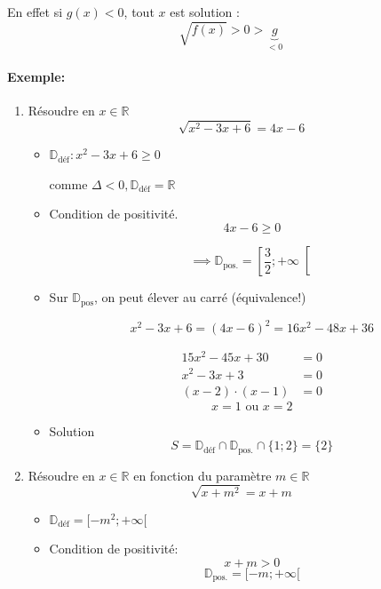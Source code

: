 \documentclass[
    11pt,
    a4paper,
    oneside,
    headinlcude, footinclude,
    twoside,
]{report}
\begin{document}
En effet si $g(x) < 0$, tout $x$ est solution :
$$\sqrt{f(x)} > 0 > \underbrace{g}_{<0}$$

\paragraph{Exemple:}

\begin{enumerate}
    \item Résoudre en $x \in \mathbb{R}$ $$\sqrt{x^{2} - 3x + 6} = 4x - 6$$

    \begin{itemize}
        \item $\mathbb{D}_{\text{déf}}: x^{2}-3x + 6 \geq 0$ 
            
            comme $\Delta < 0, \mathbb{D}_{\text{déf}} = \mathbb{R}$
        \item Condition de positivité. $$4x - 6 \geq 0$$

            $$\implies \mathbb{D}_{\text{pos.}} = \left[\frac{3}{2}; + \infty \right[$$

        \item Sur $\mathbb{D}_{\text{pos}}$, on peut élever au carré (équivalence!)

            $$x^{2} - 3x + 6 = (4x - 6)^{2} = 16 x^{2} - 48 x + 36$$

            \[
                \begin{split}
                    15 x ^{2} - 45 x + 30 &= 0\\
                    x^{2} - 3 x + 3 &= 0\\
                    (x -2 )\cdot (x -1 ) &= 0
                \end{split}
            \]
            $$x = 1 \text{ ou } x = 2$$

        \item Solution $$S = \mathbb{D}_{\text{déf}} \cap \mathbb{D}_{\text{pos.}}
            \cap \{1; 2\} = \{2\}$$
    \end{itemize}


    \item Résoudre en $x \in \mathbb{R}$ en fonction du paramètre $m \in \mathbb{R}$
    $$\sqrt{x + m^{2}} = x + m$$

    \begin{itemize}
        \item $\mathbb{D}_{\text{déf}} = [-m^{2}; + \infty[$
        \item Condition de positivité: $$x + m > 0$$
            $$\mathbb{D}_{\text{pos.}} = [-m; + \infty[$$


\end{itemize}
\end{enumerate}
\end{document}
